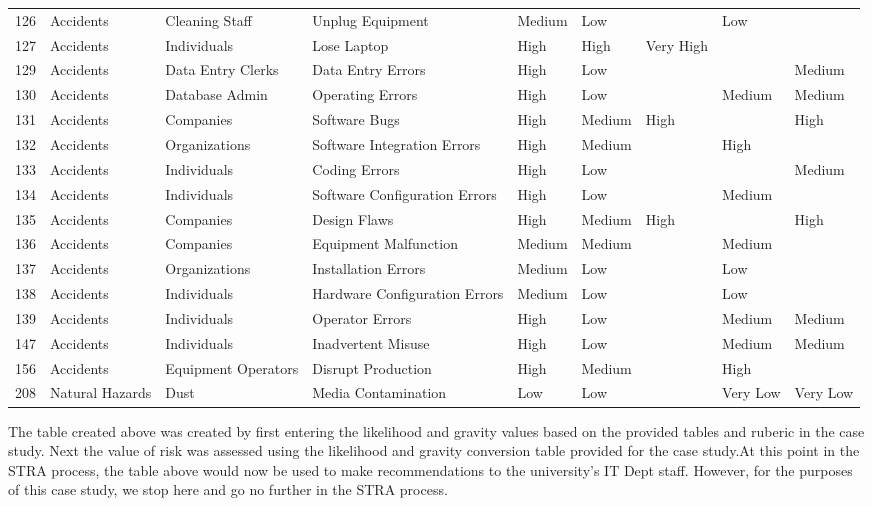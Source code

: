 \documentclass[paper=a4, fontsize=11pt]{scrartcl} %
\numberwithin{equation}{section} %
\numberwithin{figure}{section} %
\numberwithin{table}{section} %
\begin{document}
\begin{center}
{\begin{tabular}{| l | l | l | p{2cm} | p{2cm} | p{2cm} | p{2cm} | p{2cm} | p{2cm} |}
    126 & Accidents & Cleaning Staff & Unplug Equipment & Medium & Low &  & Low &  \\
    127 & Accidents & Individuals & Lose Laptop & High & High & Very High &  &  \\
    129 & Accidents & Data Entry Clerks & Data Entry Errors & High & Low &  &  & Medium \\
    130 & Accidents & Database Admin & Operating Errors & High & Low &  & Medium & Medium \\
    131 & Accidents & Companies & Software Bugs & High & Medium & High &  & High \\
    132 & Accidents & Organizations & Software Integration Errors & High & Medium &  & High &  \\
    133 & Accidents & Individuals & Coding Errors & High & Low &  &  & Medium \\
    134 & Accidents & Individuals & Software Configuration Errors & High & Low &  & Medium &  \\
    135 & Accidents & Companies & Design Flaws & High & Medium & High &  & High \\
    136 & Accidents & Companies & Equipment Malfunction & Medium & Medium &  & Medium &  \\
    137 & Accidents & Organizations & Installation Errors & Medium & Low &  & Low &  \\
    138 & Accidents & Individuals & Hardware Configuration Errors & Medium & Low &  & Low &  \\
    139 & Accidents & Individuals & Operator Errors & High & Low &  & Medium & Medium \\
    147 & Accidents & Individuals & Inadvertent Misuse & High & Low &  & Medium & Medium \\
    156 & Accidents & Equipment Operators & Disrupt Production & High & Medium &  & High &  \\
    208 & Natural Hazards & Dust & Media Contamination & Low & Low &  & Very Low & Very Low \\
    \hline
    \end{tabular}}
\end{center}

The table created above was created by first entering the likelihood and gravity values based on the provided
tables and ruberic in the case study. Next the value of risk was assessed using the likelihood and gravity conversion
table provided for the case study.At this point in the STRA process, the table above would now be
used to make recommendations to the university's 
IT Dept staff. However, for the purposes of this case study, we stop here and go no further in the STRA process.
\end{document}
